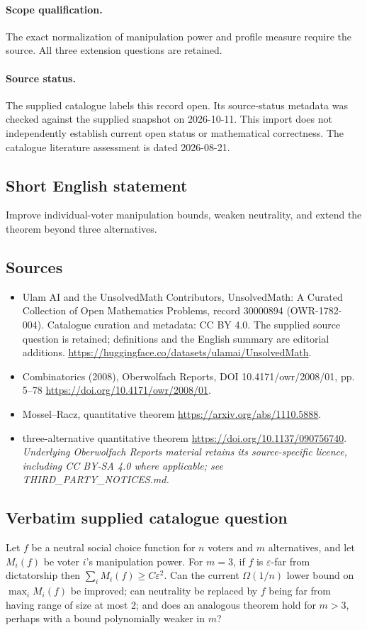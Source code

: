 \documentclass[11pt]{article}
\begin{document}
\paragraph{Scope qualification.}
The exact normalization of manipulation power and profile measure require the source. All three extension questions are retained.
\paragraph{Source status.}
The supplied catalogue labels this record open. Its source-status metadata was checked against the supplied snapshot on 2026-10-11. This import does not independently establish current open status or mathematical correctness. The catalogue literature assessment is dated 2026-08-21.
\subsection{Short English statement}
Improve individual-voter manipulation bounds, weaken neutrality, and extend the theorem beyond three alternatives.
\subsection{Sources}
\begin{itemize}
\item[S1] Ulam AI and the UnsolvedMath Contributors, UnsolvedMath: A Curated Collection of Open Mathematics Problems, record 30000894 (OWR-1782-004). Catalogue curation and metadata: CC BY 4.0. The supplied source question is retained; definitions and the English summary are editorial additions.
\url{https://huggingface.co/datasets/ulamai/UnsolvedMath}.
\item[S2] Combinatorics (2008), Oberwolfach Reports, DOI 10.4171/owr/2008/01, pp. 5--78
\url{https://doi.org/10.4171/owr/2008/01}.
\item[S3] Mossel--Racz, quantitative theorem
\url{https://arxiv.org/abs/1110.5888}.
\item[S4] three-alternative quantitative theorem
\url{https://doi.org/10.1137/090756740}.
\textit{Underlying Oberwolfach Reports material retains its source-specific licence, including CC BY-SA 4.0 where applicable; see THIRD\_PARTY\_NOTICES.md.}
\end{itemize}
\subsection{Verbatim supplied catalogue question}
Let $f$ be a neutral social choice function for $n$ voters and $m$ alternatives, and let $M_i(f)$ be voter $i$'s manipulation power. For $m=3$, if $f$ is $\varepsilon$-far from dictatorship then $\sum_iM_i(f)\geq C\varepsilon^2$. Can the current $\Omega(1/n)$ lower bound on $\max_iM_i(f)$ be improved; can neutrality be replaced by $f$ being far from having range of size at most 2; and does an analogous theorem hold for $m>3$, perhaps with a bound polynomially weaker in $m$?
\end{document}
